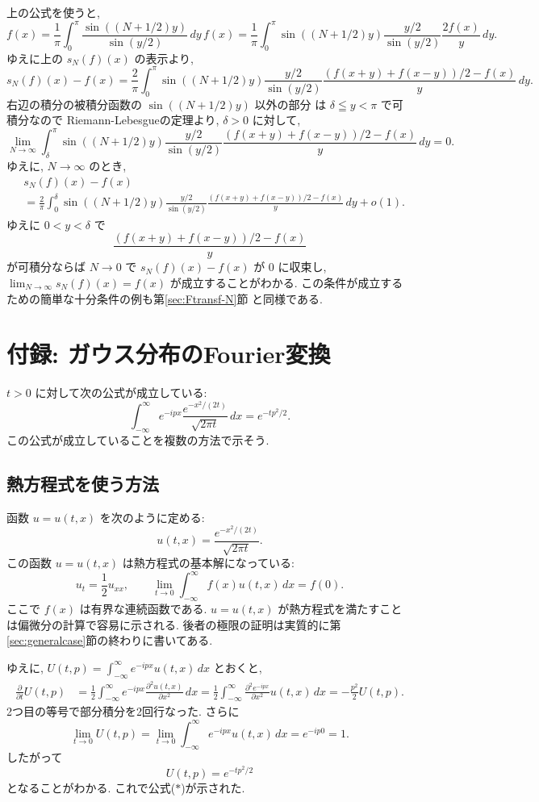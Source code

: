 \documentclass[12pt,twoside]{jarticle}
\renewcommand\d{\partial}
\theoremstyle{jplain}
\theoremstyle{jplain}
\theoremstyle{jplain}
\numberwithin{theorem}{section}
\numberwithin{equation}{section}
\numberwithin{figure}{section}
\numberwithin{table}{section}
\newcommand\secref[1]{第\ref{#1}節}
\begin{document}
上の公式を使うと, 
\[
f(x)
=\frac{1}{\pi}\int_0^{\pi}\frac{\sin((N+1/2)y)}{\sin(y/2)}\,dy\,f(x)
=\frac{1}{\pi}\int_0^{\pi}\sin((N+1/2)y)\frac{y/2}{\sin(y/2)}\frac{2f(x)}{y}\,dy.
\]
ゆえに上の $s_N(f)(x)$ の表示より, 
\[
s_N(f)(x)-f(x)
=\frac{2}{\pi}\int_0^\pi
\sin((N+1/2)y)
\frac{y/2}{\sin(y/2)}\frac{(f(x+y)+f(x-y))/2-f(x)}{y}\,dy.
\]
右辺の積分の被積分函数の $\sin((N+1/2)y)$ 以外の部分
は $\delta\leqq y<\pi$ で可積分なので
Riemann-Lebesgueの定理より, $\delta>0$ に対して, 
\[
\lim_{N\to\infty}
\int_\delta^\pi
\sin((N+1/2)y)
\frac{y/2}{\sin(y/2)}\frac{(f(x+y)+f(x-y))/2-f(x)}{y}\,dy=0.
\]
ゆえに, $N\to\infty$ のとき, 
\begin{align*}
&
s_N(f)(x)-f(x)
\\ &
=\frac{2}{\pi}\int_0^\delta
\sin((N+1/2)y)
\frac{y/2}{\sin(y/2)}\frac{(f(x+y)+f(x-y))/2-f(x)}{y}\,dy + o(1).
\end{align*}
ゆえに $0<y<\delta$ で
\[
\frac{(f(x+y)+f(x-y))/2-f(x)}{y}
\]
が可積分ならば $N\to 0$ で $s_N(f)(x)-f(x)$ が $0$ に収束し, 
$\lim_{N\to\infty}s_N(f)(x)=f(x)$ が成立することがわかる.
この条件が成立するための簡単な十分条件の例も\secref{sec:Ftransf-N}
と同様である.


\section{付録: ガウス分布のFourier変換}
\label{sec:Gauss-Fourier}

$t>0$ に対して次の公式が成立している:
\[
\int_{-\infty}^\infty e^{-ipx} \frac{e^{-x^2/(2t)}}{\sqrt{2\pi t}}\,dx
= e^{-tp^2/2}.
\tag{$*$}
\]
この公式が成立していることを複数の方法で示そう.

\subsection{熱方程式を使う方法}

函数 $u=u(t,x)$ を次のように定める:
\[
u(t,x)
= \frac{e^{-x^2/(2t)}}{\sqrt{2\pi t}}.
\]
この函数 $u=u(t,x)$ は熱方程式の基本解になっている:
\[
u_t = \frac{1}{2}u_{xx}, \qquad
\lim_{t\to 0}\int_{-\infty}^\infty f(x) u(t,x)\,dx=f(0).
\]
ここで $f(x)$ は有界な連続函数である. 
$u=u(t,x)$ が熱方程式を満たすことは偏微分の計算で容易に示される.
後者の極限の証明は実質的に\secref{sec:generalcase}の終わりに書いてある.

ゆえに, $U(t,p)=\int_{-\infty}^\infty e^{-ipx} u(t,x)\,dx$ とおくと, 
\begin{align*}
\frac{\d}{\d t}U(t,p)
&=
\frac{1}{2}
\int_{-\infty}^\infty e^{-ipx} \frac{\d^2 u(t,x)}{\d x^2}\,dx
=
\frac{1}{2}
\int_{-\infty}^\infty \frac{\d^2 e^{-ipx}}{\d x^2}  u(t,x)\,dx
=
-\frac{p^2}{2}U(t,p).
\end{align*}
2つ目の等号で部分積分を2回行なった. さらに
\[
\lim_{t\to 0}U(t,p)
=\lim_{t\to 0} \int_{-\infty}^\infty e^{-ipx} u(t,x)\,dx
=e^{-ip0}
=1.
\]
したがって
\[
U(t,p)=e^{-tp^2/2}
\]
となることがわかる. これで公式($*$)が示された.
\end{document}
